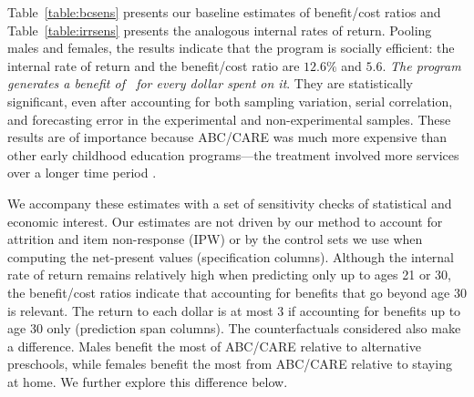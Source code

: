 Table~\ref{table:bcsens} presents our baseline estimates of benefit/cost ratios and Table~\ref{table:irrsens} presents the analogous internal rates of return. Pooling males and females, the results indicate that the program is socially efficient: the internal rate of return and the benefit/cost ratio are $12.6\%$ and $5.6$. \textit{The program generates a benefit of \bcp\ for every dollar spent on it}. They are statistically significant, even after accounting for both sampling variation, serial correlation, and forecasting error in the experimental and non-experimental samples. These results are of importance because ABC/CARE was much more expensive than other early childhood education programs---the treatment involved more services over a longer time period \citep{Elango_Hojman_etal_2016_Early-Edu}.

We accompany these estimates with a set of sensitivity checks of statistical and economic interest. Our estimates are not driven by our method to account for attrition and item non-response (IPW) or by the control sets we use when computing the net-present values (specification columns).  Although the internal rate of return remains relatively high when predicting only up to ages 21 or 30, the benefit/cost ratios indicate that accounting for benefits that go beyond age 30 is relevant. The return to each dollar is at most $3$ if accounting for benefits up to age 30 only (prediction span columns). The counterfactuals considered also make a difference. Males benefit the most of ABC/CARE relative to alternative preschools, while females benefit the most from ABC/CARE relative to staying at home. We further explore this difference below.

